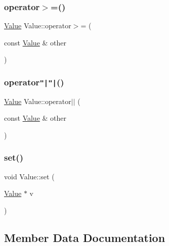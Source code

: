\mbox{\label{classValue_a85a296609b51245c4aec34ebf206a66d}} 
\subsubsection{\texorpdfstring{operator$>$=()}{operator>=()}}
{\footnotesize\ttfamily \hyperlink{classValue}{Value} Value\+::operator$>$= (\begin{DoxyParamCaption}\item[{const \hyperlink{classValue}{Value} \&}]{other }\end{DoxyParamCaption})}

\mbox{\label{classValue_a2bb40009194bb698b113dc71154d888a}} 
\subsubsection{\texorpdfstring{operator\texttt{"|}\texttt{"|}()}{operator||()}}
{\footnotesize\ttfamily \hyperlink{classValue}{Value} Value\+::operator$\vert$$\vert$ (\begin{DoxyParamCaption}\item[{const \hyperlink{classValue}{Value} \&}]{other }\end{DoxyParamCaption})}

\mbox{\label{classValue_a83944ac4d53d5bd27fd6a0bd2bc1bd3a}} 
\subsubsection{\texorpdfstring{set()}{set()}}
{\footnotesize\ttfamily void Value\+::set (\begin{DoxyParamCaption}\item[{\hyperlink{classValue}{Value} $\ast$}]{v }\end{DoxyParamCaption})}



\subsection{Member Data Documentation}
\mbox{\label{classValue_ad1da8326a7b233b3cc1708236cecfc6b}} 
